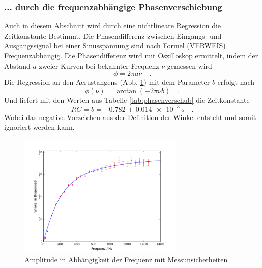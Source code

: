 \subsubsection{... durch die frequenzabhängige Phasenverschiebung}
Auch in diesem Abschnitt wird durch eine nichtlineare Regression die Zeitkonstante Bestimmt. Die Phasendifferenz zwischen Eingangs- und Ausgangssignal bei einer Sinusspannung sind nach Formel (VERWEIS) Frequenzabhängig. Die Phasendifferenz wird mit Oszilloskop ermittelt, indem der Abstand $a$ zweier Kurven bei bekannter Frequenz $\nu$ gemessen wird
\begin{equation}
\phi = 2 \pi a \nu \quad .
\end{equation}
Die Regression an den Acrustangens (Abb. \ref{fig:phasenverschub}) mit dem Parameter $b$ erfolgt nach
\begin{equation}
\phi (\nu) = \arctan(-2\pi \nu b) \quad .
\end{equation}
Und liefert mit den Werten aus Tabelle \ref{tab:phasenverschub} die Zeitkonstante
\begin{equation}
RC = b = \SI{-0.782(14)e-3}{\second} \quad.
\end{equation}
Wobei das negative Vorzeichen aus der Definition der Winkel entsteht und somit ignoriert werden kann.

\begin{figure}[h!]
	\centering
	\includegraphics[width=0.7\textwidth]{Phasenverschub1.png}
	\caption{Amplitude in Abhängigkeit der Frequenz mit Messunsicherheiten}
	\label{fig:phasenverschub}
\end{figure} 


